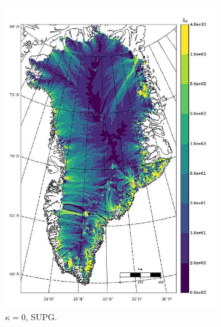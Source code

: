 \begin{figure}
\begin{subfigure}[b]{0.25\linewidth}
    \includegraphics[width=\linewidth]{images/balance_velocity/greenland/d_U_ob/Ubar_5H_kappa_0_SUPG.jpg}
  \caption{$\kappa = 0$, SUPG.}
  \label{greenland_bv_image_d_U_ob_kappa_0_SUPG}
  \end{subfigure}
  \begin{subfigure}[b]{0.25\linewidth}

\end{subfigure}
\end{figure}
